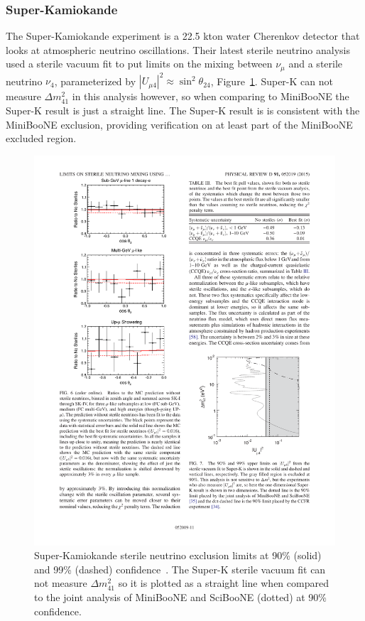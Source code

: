 \documentclass[aps,prd,twocolumn,nofootinbib]{revtex4-1}
\begin{document}
\subsubsection{Super-Kamiokande}
The Super-Kamiokande experiment is a 22.5 kton water Cherenkov detector that looks at atmospheric neutrino oscillations. Their latest sterile neutrino analysis~\cite{SuperK} used a sterile vacuum fit to put limits on the mixing between $\nu_{\mu}$ and a sterile neutrino $\nu_4$, parameterized by $\left|U_{\mu 4}\right|^2 \approx \sin^2 \theta_{24}$, Figure~\ref{fig:SuperK}. Super-K can not measure $\Delta m^{2}_{41}$ in this analysis however, so when comparing to MiniBooNE the Super-K result is just a straight line. The Super-K result is is consistent with the MiniBooNE exclusion, providing verification on at least part of the MiniBooNE excluded region.

\begin{figure}[H]
 \centering
 \includegraphics[width=1\columnwidth]{../figures/sk1.pdf}
 \caption{Super-Kamiokande sterile neutrino exclusion limits at 90\% (solid) and 99\% (dashed) confidence~\cite{SuperK}. The Super-K sterile vacuum fit can not measure $\Delta m^{2}_{41}$ so it is plotted as a straight line when compared to the joint analysis of MiniBooNE and SciBooNE (dotted) at 90\% confidence.}
 \label{fig:SuperK}
\end{figure}
\end{document}
